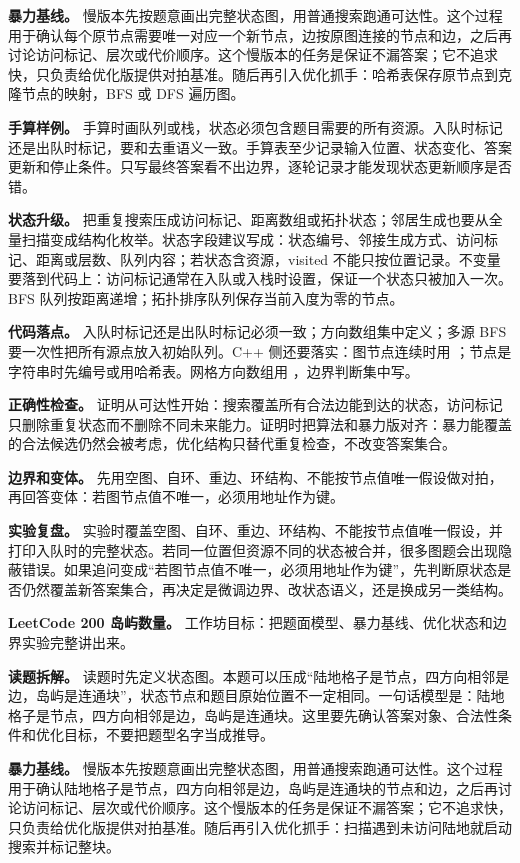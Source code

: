 \textbf{暴力基线。} 慢版本先按题意画出完整状态图，用普通搜索跑通可达性。这个过程用于确认每个原节点需要唯一对应一个新节点，边按原图连接的节点和边，之后再讨论访问标记、层次或代价顺序。这个慢版本的任务是保证不漏答案；它不追求快，只负责给优化版提供对拍基准。随后再引入优化抓手：哈希表保存原节点到克隆节点的映射，BFS 或 DFS 遍历图。

\textbf{手算样例。} 手算时画队列或栈，状态必须包含题目需要的所有资源。入队时标记还是出队时标记，要和去重语义一致。手算表至少记录输入位置、状态变化、答案更新和停止条件。只写最终答案看不出边界，逐轮记录才能发现状态更新顺序是否错。

\textbf{状态升级。} 把重复搜索压成访问标记、距离数组或拓扑状态；邻居生成也要从全量扫描变成结构化枚举。状态字段建议写成：状态编号、邻接生成方式、访问标记、距离或层数、队列内容；若状态含资源，visited 不能只按位置记录。不变量要落到代码上：访问标记通常在入队或入栈时设置，保证一个状态只被加入一次。BFS 队列按距离递增；拓扑排序队列保存当前入度为零的节点。

\textbf{代码落点。} 入队时标记还是出队时标记必须一致；方向数组集中定义；多源 BFS 要一次性把所有源点放入初始队列。C++ 侧还要落实：图节点连续时用 ；节点是字符串时先编号或用哈希表。网格方向数组用 ，边界判断集中写。

\textbf{正确性检查。} 证明从可达性开始：搜索覆盖所有合法边能到达的状态，访问标记只删除重复状态而不删除不同未来能力。证明时把算法和暴力版对齐：暴力能覆盖的合法候选仍然会被考虑，优化结构只替代重复检查，不改变答案集合。

\textbf{边界和变体。} 先用空图、自环、重边、环结构、不能按节点值唯一假设做对拍，再回答变体：若图节点值不唯一，必须用地址作为键。

\textbf{实验复盘。} 实验时覆盖空图、自环、重边、环结构、不能按节点值唯一假设，并打印入队时的完整状态。若同一位置但资源不同的状态被合并，很多图题会出现隐蔽错误。如果追问变成“若图节点值不唯一，必须用地址作为键”，先判断原状态是否仍然覆盖新答案集合，再决定是微调边界、改状态语义，还是换成另一类结构。

\noindent\textbf{LeetCode 200 岛屿数量。} 工作坊目标：把题面模型、暴力基线、优化状态和边界实验完整讲出来。

\textbf{读题拆解。} 读题时先定义状态图。本题可以压成“陆地格子是节点，四方向相邻是边，岛屿是连通块”，状态节点和题目原始位置不一定相同。一句话模型是：陆地格子是节点，四方向相邻是边，岛屿是连通块。这里要先确认答案对象、合法性条件和优化目标，不要把题型名字当成推导。

\textbf{暴力基线。} 慢版本先按题意画出完整状态图，用普通搜索跑通可达性。这个过程用于确认陆地格子是节点，四方向相邻是边，岛屿是连通块的节点和边，之后再讨论访问标记、层次或代价顺序。这个慢版本的任务是保证不漏答案；它不追求快，只负责给优化版提供对拍基准。随后再引入优化抓手：扫描遇到未访问陆地就启动搜索并标记整块。

